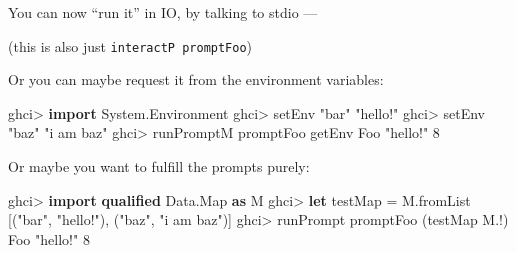 \documentclass[]{article}
\newenvironment{Shaded}{}{}
\newcommand{\CommentTok}[1]{\textcolor[rgb]{0.38,0.63,0.69}{\textit{#1}}}
\newcommand{\DataTypeTok}[1]{\textcolor[rgb]{0.56,0.13,0.00}{#1}}
\newcommand{\DecValTok}[1]{\textcolor[rgb]{0.25,0.63,0.44}{#1}}
\newcommand{\FunctionTok}[1]{\textcolor[rgb]{0.02,0.16,0.49}{#1}}
\newcommand{\KeywordTok}[1]{\textcolor[rgb]{0.00,0.44,0.13}{\textbf{#1}}}
\newcommand{\NormalTok}[1]{#1}
\newcommand{\OtherTok}[1]{\textcolor[rgb]{0.00,0.44,0.13}{#1}}
\newcommand{\StringTok}[1]{\textcolor[rgb]{0.25,0.44,0.63}{#1}}
\begin{document}
You can now ``run it'' in IO, by talking to stdio ---

\begin{Shaded}
\end{Shaded}

(this is also just \texttt{interactP\ promptFoo})

Or you can maybe request it from the environment variables:

\begin{Shaded}
\begin{Highlighting}[]
\NormalTok{ghci}\FunctionTok{>} \KeywordTok{import} \DataTypeTok{System.Environment}
\NormalTok{ghci}\FunctionTok{>}\NormalTok{ setEnv }\StringTok{"bar"} \StringTok{"hello!"}
\NormalTok{ghci}\FunctionTok{>}\NormalTok{ setEnv }\StringTok{"baz"} \StringTok{"i am baz"}
\NormalTok{ghci}\FunctionTok{>}\NormalTok{ runPromptM promptFoo getEnv}
\DataTypeTok{Foo} \StringTok{"hello!"} \DecValTok{8}
\end{Highlighting}
\end{Shaded}

Or maybe you want to fulfill the prompts purely:

\begin{Shaded}
\begin{Highlighting}[]
\NormalTok{ghci}\FunctionTok{>} \KeywordTok{import} \KeywordTok{qualified} \DataTypeTok{Data.Map} \KeywordTok{as} \DataTypeTok{M}
\NormalTok{ghci}\FunctionTok{>} \KeywordTok{let}\NormalTok{ testMap }\FunctionTok{=}\NormalTok{ M.fromList [(}\StringTok{"bar"}\NormalTok{, }\StringTok{"hello!"}\NormalTok{), (}\StringTok{"baz"}\NormalTok{, }\StringTok{"i am baz"}\NormalTok{)]}
\NormalTok{ghci}\FunctionTok{>}\NormalTok{ runPrompt promptFoo (testMap }\FunctionTok{M.!}\NormalTok{)}
\DataTypeTok{Foo} \StringTok{"hello!"} \DecValTok{8}
\end{Highlighting}
\end{Shaded}
\end{document}
